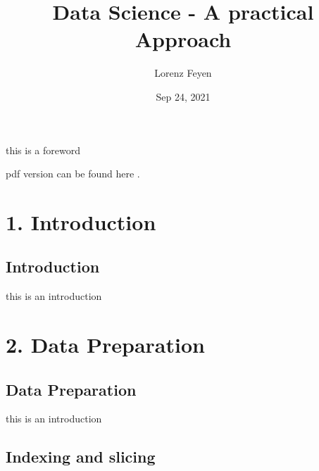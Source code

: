 \documentclass[letterpaper,10pt,english]{jupyterBook}
\title{Data Science - A practical Approach}
\date{Sep 24, 2021}
\author{Lorenz Feyen}
\begin{document}
\pagestyle{empty}
\sphinxmaketitle
\pagestyle{plain}
\sphinxtableofcontents
\pagestyle{normal}
\label{\detokenize{foreword::doc}}


\sphinxAtStartPar
this is a foreword

\sphinxAtStartPar
pdf version can be found here .


\part{1. Introduction}


\chapter{Introduction}
\label{\detokenize{c1_introduction/introduction:introduction}}\label{\detokenize{c1_introduction/introduction::doc}}
\sphinxAtStartPar
this is an introduction


\part{2. Data Preparation}


\chapter{Data Preparation}
\label{\detokenize{c2_data_preparation/introduction:data-preparation}}\label{\detokenize{c2_data_preparation/introduction::doc}}
\sphinxAtStartPar
this is an introduction


\chapter{Indexing and slicing}
\label{\detokenize{c2_data_preparation/indexing_slicing:indexing-and-slicing}}\label{\detokenize{c2_data_preparation/indexing_slicing::doc}}
\begin{sphinxVerbatim}[commandchars=\\\{\}]
   
\end{sphinxVerbatim}

\begin{sphinxVerbatim}[commandchars=\\\{\}]
  
\end{sphinxVerbatim}
\end{document}
